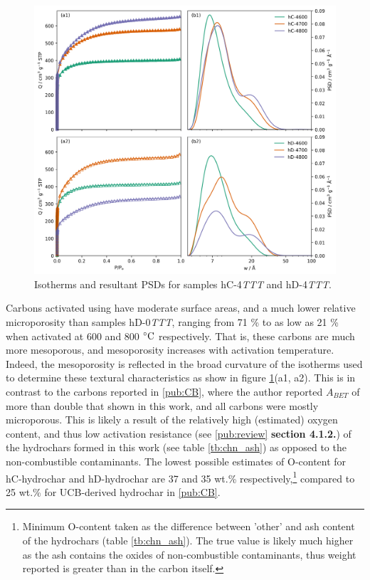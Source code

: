 \begin{figure}[t]
    \centering
    \includegraphics[width=\columnwidth, keepaspectratio]{4-cbs/figs/CB_n2_isotherms.png}
    \caption{Isotherms and resultant PSDs for samples hC-4\textit{TTT} and hD-4\textit{TTT}.}
    \label{fig:cb_isopsd}
\end{figure}

Carbons activated using  have moderate surface areas, and a much lower relative microporosity than samples hD-0\textit{TTT}, ranging from 71 \% to as low as 21 \% when activated at 600 and 800 $\rm ^{\circ}C$ respectively. That is, these carbons are much more mesoporous, and mesoporosity increases with activation temperature. Indeed, the mesoporosity is reflected in the broad curvature of the  isotherms used to determine these textural characteristics as show in figure \ref{fig:cb_isopsd}(a1, a2). This is in contrast to the carbons reported in \ref{pub:CB}, where the author reported $A_{BET}$ of more than double that shown in this work, and all carbons were mostly microporous. This is likely a result of the relatively high (estimated) oxygen content, and thus low activation resistance (see \ref{pub:review} \textbf{section 4.1.2.}) of the hydrochars formed in this work (see table \ref{tb:chn_ash}) as opposed to the non-combustible contaminants. The lowest possible estimates of O-content for hC-hydrochar and hD-hydrochar are 37 and 35 wt.\% respectively,\footnote{Minimum O-content taken as the difference between 'other' and ash content of the hydrochars (table \ref{tb:chn_ash}). The true value is likely much higher as the ash contains the oxides of non-combustible contaminants, thus weight reported is greater than in the carbon itself.} compared to 25 wt.\% for UCB-derived hydrochar in \ref{pub:CB}. 


